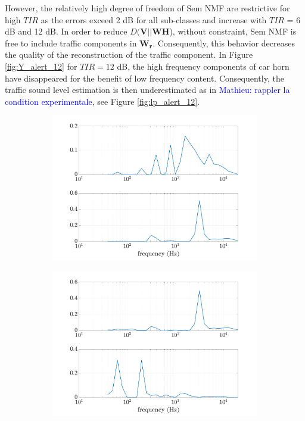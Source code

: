 \documentclass[twocolumn,a4paper,10pt]{article}
\newcommand{\ml}[1]{\textcolor{blue}{ Mathieu: #1}}
\begin{document}
However, the relatively high degree of freedom of Sem NMF are restrictive for high $TIR$ as the errors exceed 2 dB for all sub-classes and increase with $TIR$ = 6 dB and 12 dB. In order to reduce $D(\mathbf{V} \vert \vert \mathbf{WH}$), without constraint, Sem NMF is free to include traffic components in $\mathbf{W_r}$. Consequently, this behavior decreases the quality of the reconstruction of the traffic component. In Figure \ref{fig:Y_alert_12} for $TIR=12$ dB, the high frequency components of car horn have disappeared for the benefit of low frequency content. Consequently, the traffic sound level estimation is then underestimated as in \ml{rappler la condition experimentale}, see Figure \ref{fig:lp_alert_12}. \\

\begin{figure}
    \centering
    \begin{subfigure}[t]{0.45\textwidth}
        \centering
        \includegraphics[width=\linewidth]{figures/Y_alert_-12.pdf}
        \caption{}
        \label{fig:Y_alert-12}
    \end{subfigure}%
    \hfill
    \begin{subfigure}[t]{0.45\textwidth}
        \centering
        \includegraphics[width=\linewidth]{figures/Y_alert_12.pdf}

\end{subfigure}
\end{figure}
\end{document}
